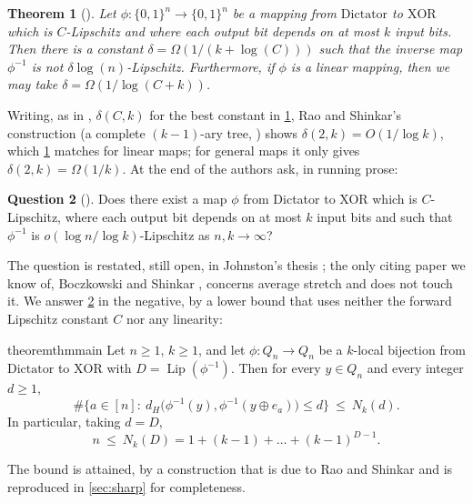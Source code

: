 \documentclass[11pt,a4paper]{article}
\theoremstyle{plain}
\newtheorem{theorem}{Theorem}[section]
\theoremstyle{definition}
\newtheorem{question}[theorem]{Question}
\theoremstyle{remark}
\newcommand{\dH}{d_H}
\newcommand{\Lip}{\operatorname{Lip}}
\newcommand{\Dict}{\mathrm{Dictator}}
\newcommand{\XOR}{\mathrm{XOR}}
\begin{document}
\begin{theorem}[{\cite[Theorem~1]{JS21}}]\label{thm:JS}
Let $\phi\colon\{0,1\}^n\to\{0,1\}^n$ be a mapping from $\Dict$ to $\XOR$ which is $C$-Lipschitz and where each output bit depends on at most $k$ input bits. Then there is a constant $\delta=\Omega(1/(k+\log(C)))$ such that the inverse map $\phi^{-1}$ is not $\delta\log(n)$-Lipschitz. Furthermore, if $\phi$ is a linear mapping, then we may take $\delta=\Omega(1/\log(C+k))$.
\end{theorem}

Writing, as in \cite{JS21}, $\delta(C,k)$ for the best constant in \cref{thm:JS}, Rao and Shinkar's construction (a complete $(k-1)$-ary tree, \cite[Theorem~2 and Appendix~A]{RS18}) shows $\delta(2,k)=O(1/\log k)$, which \cref{thm:JS} matches for linear maps; for general maps it only gives $\delta(2,k)=\Omega(1/k)$. At the end of \cite[\S2]{JS21} the authors ask, in running prose:

\begin{question}[{\cite[\S2]{JS21}}]\label{q:main}
Does there exist a map $\phi$ from Dictator to XOR which is $C$-Lipschitz, where each output bit depends on at most $k$ input bits and such that $\phi^{-1}$ is $o(\log n / \log k)$-Lipschitz as $n, k \to \infty$?
\end{question}

The question is restated, still open, in Johnston's thesis \cite{Joh21}; the only citing paper we know of, Boczkowski and Shinkar \cite{BS23}, concerns average stretch and does not touch it. We answer \cref{q:main} in the negative, by a lower bound that uses neither the forward Lipschitz constant $C$ nor any linearity:

\begin{restatable}{theorem}{thmmain}\label{thm:main}
Let $n\ge1$, $k\ge1$, and let $\phi\colon Q_n\to Q_n$ be a $k$-local bijection from $\Dict$ to $\XOR$ with $D=\Lip(\phi^{-1})$. Then for every $y\in Q_n$ and every integer $d\ge1$,
\begin{equation}\label{eq:pointwise}
\#\bigl\{a\in[n]:\ \dH\bigl(\phi^{-1}(y),\phi^{-1}(y\oplus e_a)\bigr)\le d\bigr\}\ \le\ N_k(d).
\end{equation}
In particular, taking $d=D$,
\begin{equation}\label{eq:moore}
n\ \le\ N_k(D)=1+(k-1)+\dots+(k-1)^{D-1}.
\end{equation}
\end{restatable}

The bound is attained, by a construction that is due to Rao and Shinkar \cite[Theorem~2 and Appendix~A]{RS18} and is reproduced in \cref{sec:sharp} for completeness.
\end{document}
